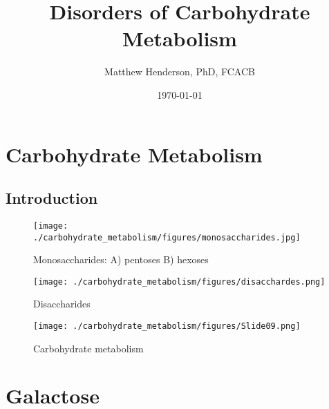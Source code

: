 \documentclass{scrartcl}
\author{Matthew Henderson, PhD, FCACB}
\date{\today}
\title{Disorders of Carbohydrate Metabolism}
\begin{document}
\maketitle
\setcounter{tocdepth}{2}
\tableofcontents


\section{Carbohydrate Metabolism}
\label{sec:org8ae0fac}
\subsection{Introduction}
\label{sec:orgb1383b7}

\begin{figure}[htbp]
\centering
\texttt{[image: ./carbohydrate\_metabolism/figures/monosaccharides.jpg]}
\caption{\label{fig:orgd9f7c2d}
Monosaccharides: A) pentoses B) hexoses}
\end{figure}

\begin{figure}[htbp]
\centering
\texttt{[image: ./carbohydrate\_metabolism/figures/disacchardes.png]}
\caption{\label{fig:org9d07d9c}
Disaccharides}
\end{figure}

\begin{figure}[htbp]
\centering
\texttt{[image: ./carbohydrate\_metabolism/figures/Slide09.png]}
\caption{\label{fig:org4d2fe66}
Carbohydrate metabolism}
\end{figure}

\section{Galactose}
\label{sec:orgba97aa8}
\end{document}
